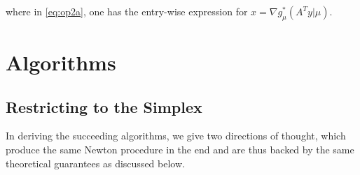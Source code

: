 \documentclass[10pt,a4paper]{article}
\numberwithin{equation}{section}
\theoremstyle{definition}
\def\rr{{\mathbb R}}
\DeclareMathOperator{\dom}{dom}
\DeclareMathOperator{\KL}{KL}
\DeclareMathOperator{\spann}{span}
\begin{document}
where in \eqref{eq:op2a}, one has the entry-wise expression for $x = \nabla g_\mu^\ast(A^Ty|\mu)$.



\section{Algorithms}

\subsection{Restricting to the Simplex}

In deriving the succeeding algorithms, we give two directions of thought, which produce the same Newton procedure in the end and are thus backed by the same theoretical guarantees as discussed below.
\end{document}
